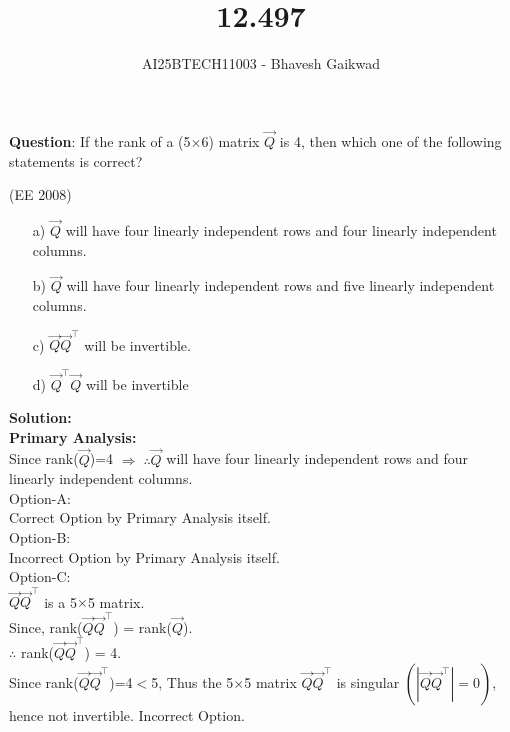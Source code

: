 \documentclass[journal]{IEEEtran}
\begin{document}

\vspace{3cm}

\title{12.497}
\author{AI25BTECH11003 - Bhavesh Gaikwad}
{\let\newpage\relax\maketitle}

\renewcommand{\thefigure}{\theenumi}
\renewcommand{\thetable}{\theenumi}
\setlength{\intextsep}{10pt} 

\renewcommand{\thetable}{\theenumi}


\textbf{Question}: If the rank of a (5$\times$6) matrix $\vec{Q}$ is 4, then which one of the following statements is correct?

\hfill{(EE 2008)}

\begin{itemize}
    \item[a)]$\vec{Q}$ will have four linearly independent rows and four linearly independent columns.
    \item[b)]$\vec{Q}$ will have four linearly independent rows and five linearly independent columns.
    \item[c)]$\vec{Q}\vec{Q}^\top$ will be invertible.
    \item[d)]$\vec{Q}^\top\vec{Q}$ will be invertible 
\end{itemize}

\bigskip
 
\textbf{Solution:}\\

\textbf{Primary Analysis:}\\
Since rank($\vec{Q}$)=4 $\Rightarrow \; \therefore \vec{Q}$ will have four linearly independent rows and four linearly independent columns.\\

Option-A:\\
Correct Option by Primary Analysis itself.\\

Option-B:\\
Incorrect Option by Primary Analysis itself.\\

Option-C:\\
$\vec{Q}\vec{Q}^\top$ is a 5$\times$5 matrix.\\
Since, rank($\vec{Q}\vec{Q}^\top$) = rank($\vec{Q}$).\\
$\therefore$ rank($\vec{Q}\vec{Q}^\top$) = 4.\\
Since rank($\vec{Q}\vec{Q}^\top$)=4$<$5, Thus the 5$\times$5 matrix $\vec{Q}\vec{Q}^\top$ is singular $\left(|\vec{Q}\vec{Q}^\top|=0\right)$, hence not invertible.
\bigskip
Incorrect Option.\\
\end{document}
